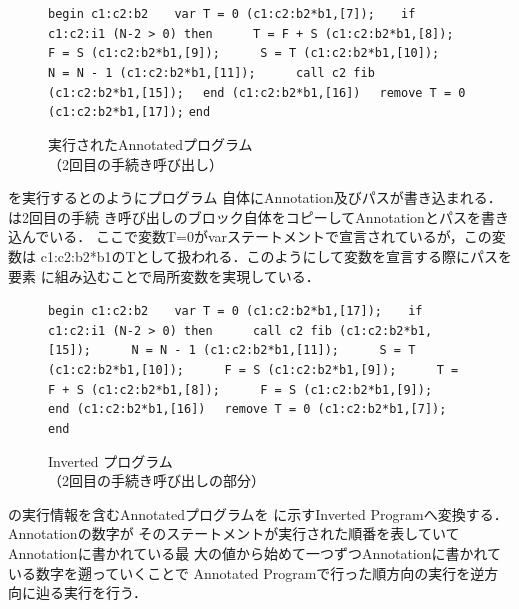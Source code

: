\documentclass[submit,PRO]{ipsj}
\def\|{\verb|}
\begin{document}
\begin{figure}[tb]
\vbox{
\hbox{\|begin c1:c2:b2|}
\hbox{\|   var T = 0 (c1:c2:b2*b1,[7]);|}
\hbox{\|   if c1:c2:i1 (N-2 > 0) then|}
\hbox{\|     T = F + S (c1:c2:b2*b1,[8]);|}
\hbox{\|     F = S (c1:c2:b2*b1,[9]);|}
\hbox{\|     S = T (c1:c2:b2*b1,[10]);|}
\hbox{\|     N = N - 1 (c1:c2:b2*b1,[11]);|}
\hbox{\|     call c2 fib (c1:c2:b2*b1,[15]);|}
\hbox{\|  end (c1:c2:b2*b1,[16])|}
\hbox{\|  remove T = 0 (c1:c2:b2*b1,[17]);|}
\hbox{\|end|}
}
\centerline{}
\caption{実行されたAnnotatedプログラム\\
（2回目の手続き呼び出し）}
\label{fig:Hexec}
\end{figure}

を実行するとのようにプログラム
自体にAnnotation及びパスが書き込まれる．は2回目の手続
き呼び出しのブロック自体をコピーしてAnnotationとパスを書き込んでいる．
ここで変数T=0がvarステートメントで宣言されているが，この変数は
c1:c2:b2*b1のTとして扱われる．このようにして変数を宣言する際にパスを要素
に組み込むことで局所変数を実現している．

\begin{figure}[tb]
\vbox{
\hbox{\|begin c1:c2:b2|}
\hbox{\|   var T = 0 (c1:c2:b2*b1,[17]);|}
\hbox{\|   if c1:c2:i1 (N-2 > 0) then|}
\hbox{\|     call c2 fib (c1:c2:b2*b1,[15]);|}
\hbox{\|     N = N - 1 (c1:c2:b2*b1,[11]);|}
\hbox{\|     S = T (c1:c2:b2*b1,[10]);|}
\hbox{\|     F = S (c1:c2:b2*b1,[9]);|}
\hbox{\|     T = F + S (c1:c2:b2*b1,[8]);|}
\hbox{\|     F = S (c1:c2:b2*b1,[9]);|}
\hbox{\|  end (c1:c2:b2*b1,[16])|}
\hbox{\|  remove T = 0 (c1:c2:b2*b1,[7]);|}
\hbox{\|end|}
}
\centerline{}
\caption{Inverted プログラム\\
（2回目の手続き呼び出しの部分）}
\label{fig:Hinvprogram}
\end{figure}



の実行情報を含むAnnotatedプログラムを
に示すInverted Programへ変換する．Annotationの数字が
そのステートメントが実行された順番を表していてAnnotationに書かれている最
大の値から始めて一つずつAnnotationに書かれている数字を遡っていくことで
Annotated Programで行った順方向の実行を逆方向に辿る実行を行う．
\end{document}
